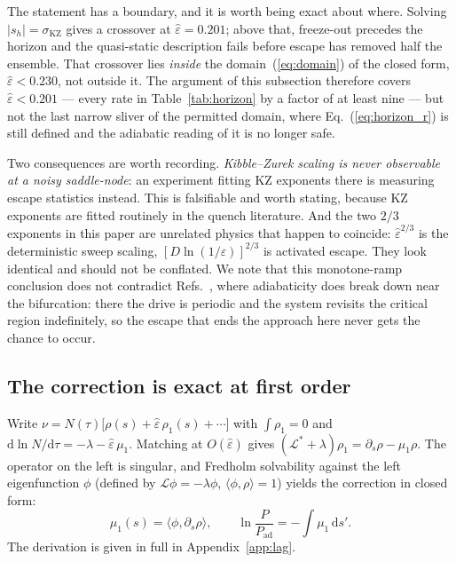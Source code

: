 \documentclass[%
 aip,
 cha,
 amsmath,amssymb,
 reprint,
 superscriptaddress,
 floatfix,
]{revtex4-2}
\newcommand{\dd}{\mathrm{d}}
\newcommand{\Leff}{\mathcal{L}}
\newcommand{\Sig}{\hat\varepsilon}
\begin{document}
The statement has a boundary, and it is worth being exact about where.  Solving $|s_h|=\sigma_{\mathrm{KZ}}$ gives a crossover at $\Sig=0.201$; above that, freeze-out precedes the horizon and the quasi-static description fails before escape has removed half the ensemble.  That crossover lies \emph{inside} the domain~(\ref{eq:domain}) of the closed form, $\Sig<0.230$, not outside it.  The argument of this subsection therefore covers $\Sig<0.201$ --- every rate in Table~\ref{tab:horizon} by a factor of at least nine --- but not the last narrow sliver of the permitted domain, where Eq.~(\ref{eq:horizon_r}) is still defined and the adiabatic reading of it is no longer safe.

Two consequences are worth recording.  \emph{Kibble--Zurek scaling is never observable at a noisy saddle-node}: an experiment fitting KZ exponents there is measuring escape statistics instead.  This is falsifiable and worth stating, because KZ exponents are fitted routinely in the quench literature.  And the two $2/3$ exponents in this paper are unrelated physics that happen to coincide: $\Sig^{2/3}$ is the deterministic sweep scaling, $[D\ln(1/\varepsilon)]^{2/3}$ is activated escape.  They look identical and should not be conflated.  We note that this monotone-ramp conclusion does not contradict Refs.~\cite{DykmanGoldingRyvkine2004,RyvkineDykmanGolding2004}, where adiabaticity does break down near the bifurcation: there the drive is periodic and the system revisits the critical region indefinitely, so the escape that ends the approach here never gets the chance to occur.

\subsection{The correction is exact at first order}

Write $\nu=N(\tau)\bigl[\rho(s)+\Sig\,\rho_1(s)+\cdots\bigr]$ with $\int\rho_1=0$ and $\dd\ln N/\dd\tau=-\lambda-\Sig\,\mu_1$.  Matching at $O(\Sig)$ gives $(\Leff^\ast+\lambda)\rho_1=\partial_s\rho-\mu_1\rho$.  The operator on the left is singular, and Fredholm solvability against the left eigenfunction $\phi$ (defined by $\Leff\phi=-\lambda\phi$, $\langle\phi,\rho\rangle=1$) yields the correction in closed form:
\begin{equation}
\label{eq:mu1}
\mu_1(s)=\langle\phi,\partial_s\rho\rangle,
\qquad
\ln\frac{P}{P_{\mathrm{ad}}}=-\int\mu_1\,\dd s' .
\end{equation}
The derivation is given in full in Appendix~\ref{app:lag}.
\end{document}
